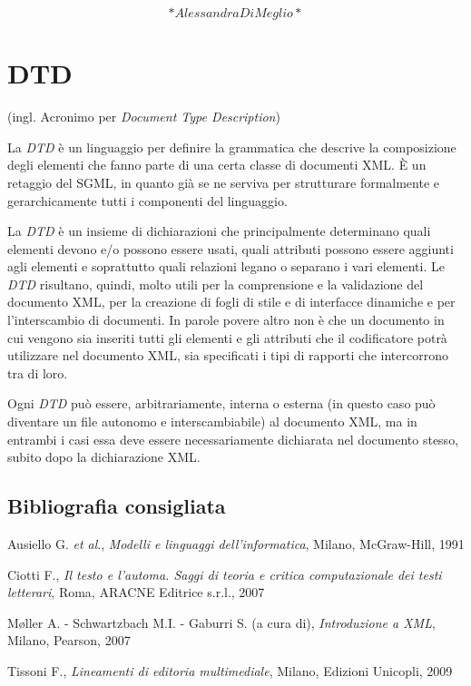 \documentclass[
  b5paper,
  twoside,
  11pt,
  chapterprefix=false,
  bibliography=totocnumbered,
  parskip=0]{scrbook}
\begin{document}
\[*Alessandra Di Meglio*\]

\hypertarget{dtd}{%
\chapter{DTD}\label{dtd}}

(ingl. Acronimo per \emph{Document Type Description})

La \emph{DTD} è un linguaggio per definire la grammatica che descrive la
composizione degli elementi che fanno parte di una certa classe di
documenti XML. È un retaggio del SGML, in quanto già se ne serviva per
strutturare formalmente e gerarchicamente tutti i componenti del
linguaggio.

La \emph{DTD} è un insieme di dichiarazioni che principalmente determinano
quali elementi devono e/o possono essere usati, quali attributi possono
essere aggiunti agli elementi e soprattutto quali relazioni legano o
separano i vari elementi. Le \emph{DTD} risultano, quindi, molto utili per la
comprensione e la validazione del documento XML, per la creazione di
fogli di stile e di interfacce dinamiche e per l'interscambio di
documenti. In parole povere altro non è che un documento in cui vengono
sia inseriti tutti gli elementi e gli attributi che il codificatore
potrà utilizzare nel documento XML, sia specificati i tipi di rapporti
che intercorrono tra di loro.

Ogni \emph{DTD} può essere, arbitrariamente, interna o esterna (in questo
caso può diventare un file autonomo e interscambiabile) al documento
XML, ma in entrambi i casi essa deve essere necessariamente dichiarata
nel documento stesso, subito dopo la dichiarazione XML.

\hypertarget{bibliografia-consigliata-8}{%
\section*{Bibliografia consigliata}\label{bibliografia-consigliata-8}}

Ausiello G. \emph{et al}., \emph{Modelli e linguaggi dell'informatica}, Milano,
McGraw-Hill, 1991

Ciotti F., \emph{Il testo e l'automa. Saggi di teoria e critica
computazionale dei testi letterari}, Roma, ARACNE Editrice s.r.l., 2007

Møller A. - Schwartzbach M.I. - Gaburri S. (a cura di), \emph{Introduzione a
XML}, Milano, Pearson, 2007

Tissoni F., \emph{Lineamenti di editoria multimediale}, Milano, Edizioni
Unicopli, 2009
\end{document}
